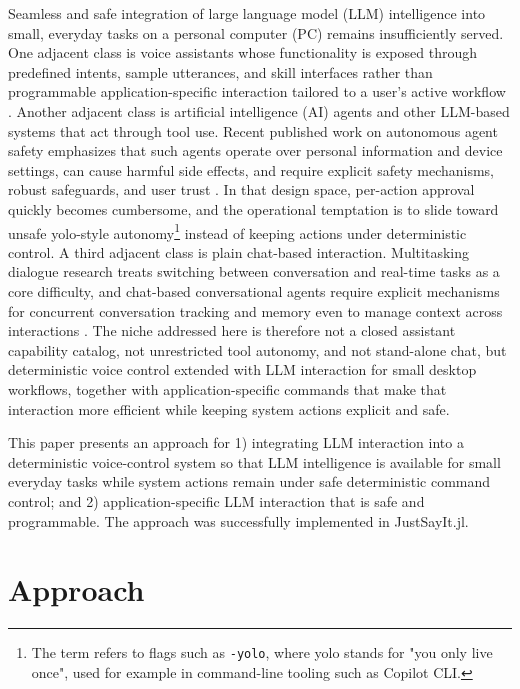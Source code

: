\documentclass{juliacon}
\begin{document}
Seamless and safe integration of large language model (LLM) intelligence into small, everyday tasks on a personal computer (PC) remains insufficiently served. One adjacent class is voice assistants whose functionality is exposed through predefined intents, sample utterances, and skill interfaces rather than programmable application-specific interaction tailored to a user's active workflow \cite{zhang2019dangerousskills}. Another adjacent class is artificial intelligence (AI) agents and other LLM-based systems that act through tool use. Recent published work on autonomous agent safety emphasizes that such agents operate over personal information and device settings, can cause harmful side effects, and require explicit safety mechanisms, robust safeguards, and user trust \cite{lee2026mobilesafetybench,jabbour2025genagents}. In that design space, per-action approval quickly becomes cumbersome, and the operational temptation is to slide toward unsafe yolo-style autonomy\footnote{The term refers to flags such as \texttt{-yolo}, where yolo stands for "you only live once", used for example in command-line tooling such as Copilot CLI.} instead of keeping actions under deterministic control. A third adjacent class is plain chat-based interaction. Multitasking dialogue research treats switching between conversation and real-time tasks as a core difficulty, and chat-based conversational agents require explicit mechanisms for concurrent conversation tracking and memory even to manage context across interactions \cite{yang2008switching,martinez2020multiparty}. The niche addressed here is therefore not a closed assistant capability catalog, not unrestricted tool autonomy, and not stand-alone chat, but deterministic voice control extended with LLM interaction for small desktop workflows, together with application-specific commands that make that interaction more efficient while keeping system actions explicit and safe.

This paper presents an approach for 1) integrating LLM interaction into a deterministic voice-control system so that LLM intelligence is available for small everyday tasks while system actions remain under safe deterministic command control; and 2) application-specific LLM interaction that is safe and programmable. The approach was successfully implemented in JustSayIt.jl.

\section{Approach}
\end{document}

